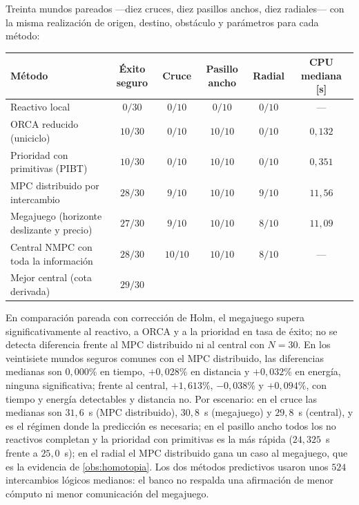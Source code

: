 \begin{observacion}
\label{obs:ensayo-r10}
Treinta mundos pareados —diez cruces, diez pasillos anchos, diez radiales— con
la misma realización de origen, destino, obstáculo y parámetros para cada
método:

\begin{center}\small
\begin{tabular}{@{}lccccc@{}}
\toprule
Método & Éxito seguro & Cruce & Pasillo ancho & Radial & CPU mediana [s] \\
\midrule
Reactivo local & $0/30$ & $0/10$ & $0/10$ & $0/10$ & --- \\
ORCA reducido (uniciclo) & $10/30$ & $0/10$ & $10/10$ & $0/10$ & $0{,}132$ \\
Prioridad con primitivas (PIBT) & $10/30$ & $0/10$ & $10/10$ & $0/10$ & $0{,}351$ \\
MPC distribuido por intercambio & $28/30$ & $9/10$ & $10/10$ & $9/10$ & $11{,}56$ \\
Megajuego (horizonte deslizante y precio) & $27/30$ & $9/10$ & $10/10$ & $8/10$ & $11{,}09$ \\
Central NMPC con toda la información & $28/30$ & $10/10$ & $10/10$ & $8/10$ & --- \\
Mejor central (cota derivada) & $29/30$ & & & & \\
\bottomrule
\end{tabular}
\end{center}

En comparación pareada con corrección de Holm, el megajuego supera
significativamente al reactivo, a ORCA y a la prioridad en tasa de éxito; no
se detecta diferencia frente al MPC distribuido ni al central con $N=30$. En
los veintisiete mundos seguros comunes con el MPC distribuido, las diferencias
medianas son $0{,}000\%$ en tiempo, $+0{,}028\%$ en distancia y $+0{,}032\%$
en energía, ninguna significativa; frente al central, $+1{,}613\%$,
$-0{,}038\%$ y $+0{,}094\%$, con tiempo y energía detectables y distancia no.
Por escenario: en el cruce las medianas son $31{,}6$~s (MPC distribuido),
$30{,}8$~s (megajuego) y $29{,}8$~s (central), y es el régimen donde la
predicción es necesaria; en el pasillo ancho todos los no reactivos completan
y la prioridad con primitivas es la más rápida ($24{,}325$~s frente a
$25{,}0$~s); en el radial el MPC distribuido gana un caso al megajuego, que es
la evidencia de \cref{obs:homotopia}. Los dos métodos predictivos usaron unos
$524$ intercambios lógicos medianos: el banco no respalda una afirmación de
menor cómputo ni menor comunicación del megajuego.
\end{observacion}

